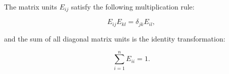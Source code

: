 The matrix units $E_{ij}$ satisfy the following multiplication rule:

$$E_{ij} E_{kl} = \delta_{jk} E_{il},$$

and the sum of all diagonal matrix units is the identity transformation:

$$\sum_{i=1}^n E_{ii} = 1.$$
